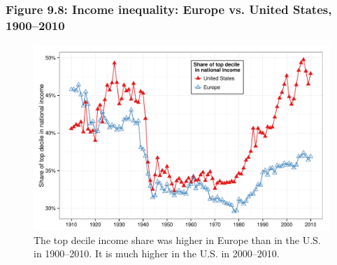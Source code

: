 \documentclass[t]{beamer}\usepackage[]{graphicx}\usepackage[]{color}
\newenvironment{knitrout}{}{} %
\begin{document}
\begin{frame}[label=Figure_9_8]
\frametitle{Figure 9.8: Income inequality: Europe vs. United States, 1900--2010}
\begin{figure}[t]
\begin{minipage}[b]{\textwidth}
\centering
\begin{knitrout}\footnotesize
{}\color{fgcolor}

{\centering \includegraphics[width=1\linewidth]{figures/color/Figure_9_8} 

}



\end{knitrout}
\caption{The top decile income share was higher in Europe than in the U.S. in 1900--2010. It is much higher in the U.S. in 2000--2010.}
\end{minipage}
\end{figure}
\end{frame}
\end{document}
